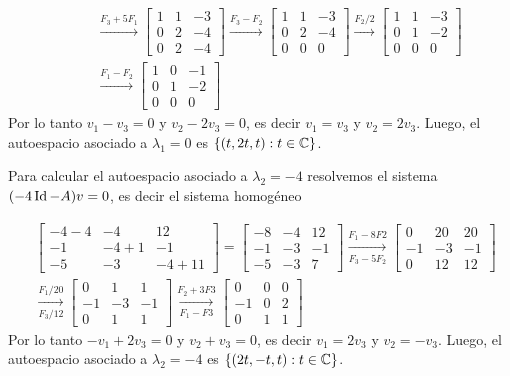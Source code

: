 \begin{enumerate}[resume,topsep=6pt,itemsep=.4cm]
\begin{align*}
        &\qquad\stackrel{F_3+5F_1}{\longrightarrow} \begin{bmatrix} 1 & 1 & -3\\ 0 & 2 & -4\\ 0 & 2 & -4 \end{bmatrix} \stackrel{F_3-F_2}{\longrightarrow} \begin{bmatrix} 1 & 1 & -3\\ 0 & 2 & -4\\ 0 & 0 & 0 \end{bmatrix}\stackrel{F_2/2}{\longrightarrow} \begin{bmatrix} 1 & 1 & -3\\ 0 & 1 & -2\\ 0 & 0 & 0 \end{bmatrix} \\
        &\qquad\stackrel{F_1-F_2}{\longrightarrow} \begin{bmatrix} 1 & 0 & -1\\ 0 & 1 & -2\\ 0 & 0 & 0 \end{bmatrix}
    \end{align*}
    Por lo tanto $v_1 - v_3 =0$ y $v_2 -2v_3=0$, es decir $v_1 = v_3$ y $v_2 = 2v_3$. Luego, el autoespacio asociado a $\lambda_1=0$ es $\{(t,2t,t): t \in \mathbb C\}$.

    Para calcular el autoespacio asociado a $\lambda_2=-4$ resolvemos el sistema  $(-4\operatorname{Id}-A)v=0$, es decir el sistema homogéneo

    \begin{align*}
        &\begin{bmatrix} -4-4 & -4 & 12\\ -1 & -4+1 & -1\\ -5 & -3 & -4+11 \end{bmatrix} =  \begin{bmatrix} -8 & -4 & 12\\ -1 & -3 & -1\\ -5 & -3 & 7 \end{bmatrix} \underset{F_3-5F_2}{\stackrel{F_1-8F2}{\longrightarrow}} \begin{bmatrix} 0 & 20 & 20\\ -1 & -3 & -1\\ 0 & 12 & 12 \end{bmatrix} \\
        &\underset{F_3/12}{\stackrel{F_1/20}{\longrightarrow}} \begin{bmatrix} 0 & 1 & 1\\ -1 & -3 & -1\\ 0 & 1 & 1 \end{bmatrix} \underset{F_1-F3}{\stackrel{F_2+3F3}{\longrightarrow}} \begin{bmatrix} 0 & 0 & 0\\ -1 & 0 & 2\\ 0 & 1 & 1 \end{bmatrix}
    \end{align*}
    Por lo tanto $-v_1 + 2v_3 =0$ y $v_2 + v_3=0$, es decir $v_1 = 2v_3$ y $v_2 = -v_3$. Luego, el autoespacio asociado a $\lambda_2=-4$ es $\{(2t,-t,t): t \in \mathbb C\}$.


\end{enumerate}
